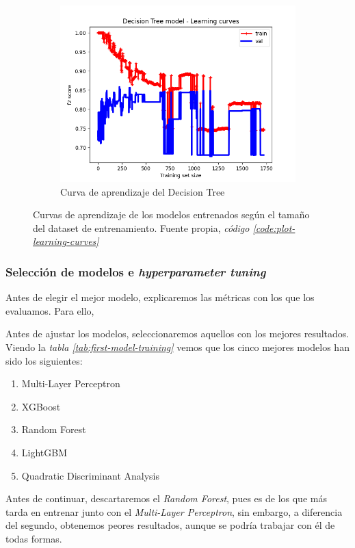 \begin{figure}[!ht]
\begin{subfigure}[b]{0.3\textwidth}
        \includegraphics[width=\linewidth]{media/images/learning-curves/dt.png}
        \caption{Curva de aprendizaje del Decision Tree}
        \label{sfig:lc-dt}
    \end{subfigure}
    \caption{Curvas de aprendizaje de los modelos entrenados según el tamaño del \gls{dataset} de entrenamiento. Fuente propia, \textit{código \ref{code:plot-learning-curves}}}
    \label{fig:learning-curves}
\end{figure}


\subsubsection{Selección de modelos e \textit{hyperparameter tuning}}
\label{sec:i1-seleccion}

Antes de elegir el mejor modelo, explicaremos las métricas con los que los evaluamos. Para ello, 

Antes de ajustar los modelos, seleccionaremos aquellos con los mejores resultados. Viendo la \textit{tabla \ref{tab:first-model-training}} vemos que los cinco mejores modelos han sido los siguientes:
\begin{enumerate}
    \item Multi-Layer Perceptron
    \item XGBoost
    \item Random Forest
    \item LightGBM
    \item Quadratic Discriminant Analysis
\end{enumerate}

Antes de continuar, descartaremos el \textit{Random Forest}, pues es de los que más tarda en entrenar junto con el \textit{Multi-Layer Perceptron}, sin embargo, a diferencia del segundo, obtenemos peores resultados, aunque se podría trabajar con él de todas formas.

